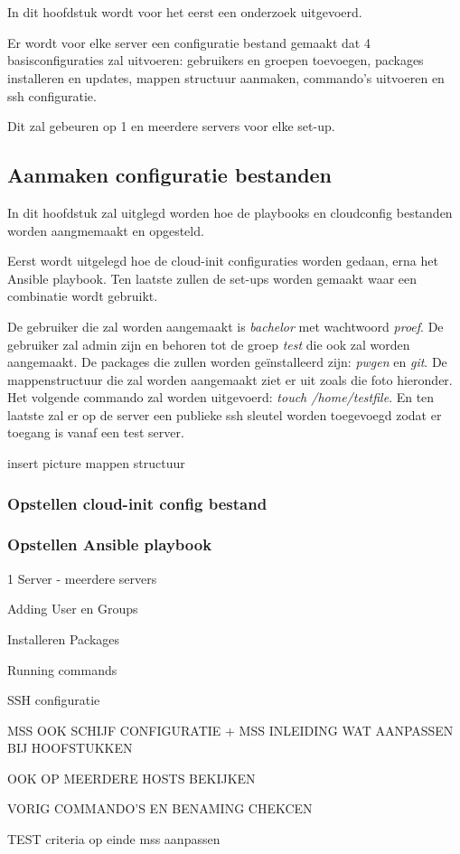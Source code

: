 \chapter{}
\label{ch:basisconf}
In dit hoofdstuk wordt voor het eerst een onderzoek uitgevoerd. 

Er wordt voor elke server een configuratie bestand gemaakt dat 4 basisconfiguraties zal uitvoeren: gebruikers en groepen toevoegen, packages installeren en updates, mappen structuur aanmaken, commando's uitvoeren en ssh configuratie. 

Dit zal gebeuren op 1 en meerdere servers voor elke set-up. 

\section{Aanmaken configuratie bestanden}
In dit hoofdstuk zal uitglegd worden hoe de playbooks en cloudconfig bestanden worden aangmemaakt en opgesteld. 

Eerst wordt uitgelegd hoe de cloud-init configuraties worden gedaan, erna het Ansible playbook. Ten laatste zullen de set-ups worden gemaakt waar een combinatie wordt gebruikt.

De gebruiker die zal worden aangemaakt is \textit{bachelor} met wachtwoord \textit{proef}. De gebruiker zal admin zijn en behoren tot de groep \textit{test} die ook zal worden aangemaakt. De packages die zullen worden geïnstalleerd zijn: \textit{pwgen} en \textit{git}. De mappenstructuur die zal worden aangemaakt ziet er uit zoals die foto hieronder. Het volgende commando zal worden uitgevoerd: \textit{touch /home/testfile}. En ten laatste zal er op de server een publieke ssh sleutel worden toegevoegd zodat er toegang is vanaf een test server.

insert picture mappen structuur
\subsection{Opstellen cloud-init config bestand}


\subsection{Opstellen Ansible playbook}



1 Server - meerdere servers

Adding User en Groups

Installeren Packages

Running commands

SSH configuratie

MSS OOK SCHIJF CONFIGURATIE + MSS INLEIDING WAT AANPASSEN BIJ HOOFSTUKKEN

OOK OP MEERDERE HOSTS BEKIJKEN

VORIG COMMANDO'S EN BENAMING CHEKCEN

TEST criteria op einde mss aanpassen